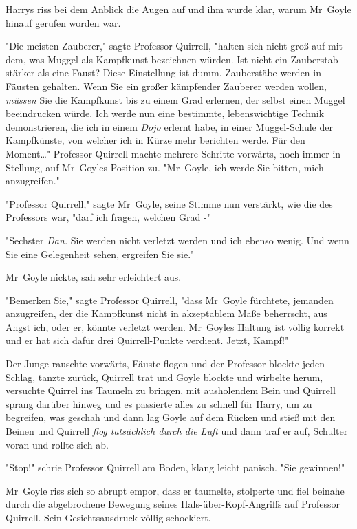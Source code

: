 {Harrys riss bei dem Anblick die Augen auf und ihm wurde klar, warum Mr~Goyle hinauf gerufen worden war.

"Die meisten Zauberer," sagte Professor Quirrell, "halten sich nicht groß auf mit dem, was Muggel als Kampfkunst bezeichnen würden. Ist nicht ein Zauberstab stärker als eine Faust? Diese Einstellung ist dumm. Zauberstäbe werden in Fäusten gehalten. Wenn Sie ein großer kämpfender Zauberer werden wollen, \emph{müssen} Sie die Kampfkunst bis zu einem Grad erlernen, der selbst einen Muggel beeindrucken würde. Ich werde nun eine bestimmte, lebenswichtige Technik demonstrieren, die ich in einem \emph{Dojo} erlernt habe, in einer Muggel-Schule der Kampfkünste, von welcher ich in Kürze mehr berichten werde. Für den Moment…" Professor Quirrell machte mehrere Schritte vorwärts, noch immer in Stellung, auf Mr~Goyles Position zu. "Mr~Goyle, ich werde Sie bitten, mich anzugreifen."

"Professor Quirrell," sagte Mr~Goyle, seine Stimme nun verstärkt, wie die des Professors war, "darf ich fragen, welchen Grad -"

"Sechster \emph{Dan.} Sie werden nicht verletzt werden und ich ebenso wenig. Und wenn Sie eine Gelegenheit sehen, ergreifen Sie sie."

Mr~Goyle nickte, sah sehr erleichtert aus.

"Bemerken Sie," sagte Professor Quirrell, "dass Mr~Goyle fürchtete, jemanden anzugreifen, der die Kampfkunst nicht in akzeptablem Maße beherrscht, aus Angst ich, oder er, könnte verletzt werden. Mr~Goyles Haltung ist völlig korrekt und er hat sich dafür drei Quirrell-Punkte verdient. Jetzt, Kampf!"

Der Junge rauschte vorwärts, Fäuste flogen und der Professor blockte jeden Schlag, tanzte zurück, Quirrell trat und Goyle blockte und wirbelte herum, versuchte Quirrel ins Taumeln zu bringen, mit ausholendem Bein und Quirrell sprang darüber hinweg und es passierte alles zu schnell für Harry, um zu begreifen, was geschah und dann lag Goyle auf dem Rücken und stieß mit den Beinen und Quirrell \emph{flog tatsächlich durch die Luft} und dann traf er auf, Schulter voran und rollte sich ab.

"Stop!" schrie Professor Quirrell am Boden, klang leicht panisch. "Sie gewinnen!"

Mr~Goyle riss sich so abrupt empor, dass er taumelte, stolperte und fiel beinahe durch die abgebrochene Bewegung seines Hals-über-Kopf-Angriffs auf Professor Quirrell. Sein Gesichtsausdruck völlig schockiert.

}
